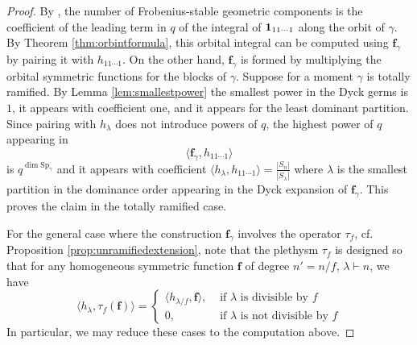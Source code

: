 \documentclass{amsart}
\numberwithin{equation}{section}
\theoremstyle{definition}
\def\16{{\bf 16}}
\def\1{{\bf 1}}
\def\Sp{{\mathrm{Sp}}}
\newcommand{\fgamma}{\mathbf{f}_{\gamma}}
\begin{document}
\begin{proof}
By \cite[Eq. (4.5)]{Tsai20}, the number of Frobenius-stable geometric components is the coefficient of the leading term in $q$ of the integral of $\1_{11\cdots 1}$ along the orbit of $\gamma$. By Theorem \ref{thm:orbintformula}, this orbital integral can be computed using $\fgamma$ by pairing it with $h_{11\cdots 1}$. On the other hand, $\fgamma$ is formed by multiplying the orbital symmetric functions for the blocks of $\gamma$. Suppose for a moment $\gamma$ is totally ramified. By Lemma \ref{lem:smallestpower} the smallest power in the Dyck germs is $1$, it appears with coefficient one, and it appears for the least dominant partition. Since pairing with $h_\lambda$ does not introduce powers of $q$, the highest power of $q$ appearing in 
$$\langle \fgamma,h_{11\cdots 1}\rangle$$ is $q^{\dim \Sp_\gamma}$ and it appears with coefficient $\langle h_\lambda,h_{11\cdots 1}\rangle=\frac{|S_n|}{|S_{\lambda}|}$
where $\lambda$ is the smallest partition in the dominance order appearing in the Dyck expansion of $\fgamma$. This proves the claim in the totally ramified case. 

For the general case where the construction $\fgamma$ involves the operator $\tau_f$, cf. Proposition \ref{prop:unramifiedextension}, note that the plethysm $\tau_f$ is designed so that for any homogeneous symmetric function $\mathbf{f}$ of degree $n'=n/f$, $\lambda\vdash n$, we have
$$\langle h_\lambda,\tau_f(\mathbf{f})\rangle=\begin{cases}
\langle h_{\lambda/f}, \mathbf{f}\rangle, & \text{ if $\lambda$ is divisible by $f$}\\
0, & \text{ if $\lambda$ is not divisible by $f$}
\end{cases}$$
In particular, we may reduce these cases to the computation above. 
\end{proof}
\end{document}
